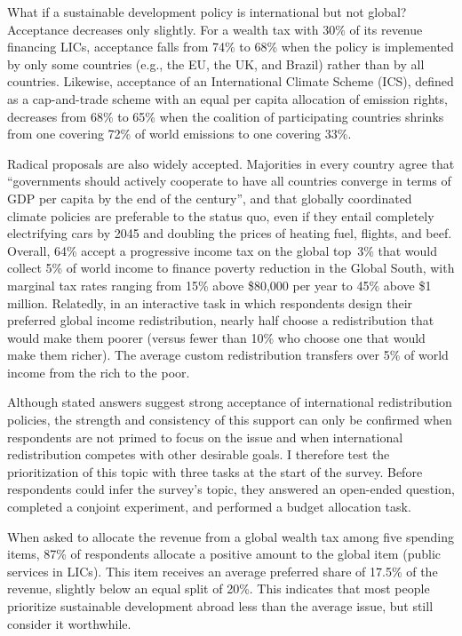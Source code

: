 \documentclass[12pt,english]{article}
\begin{document}
What if a sustainable development policy is international but not global? Acceptance decreases only slightly. For a wealth tax with 30\% of its revenue financing LICs, acceptance falls from 74\% to 68\% when the policy is implemented by only some countries (e.g., the EU, the UK, and Brazil) rather than by all countries. Likewise, acceptance of an International Climate Scheme (ICS), defined as a cap-and-trade scheme with an equal per capita allocation of emission rights, decreases from 68\% to 65\% when the coalition of participating countries shrinks from one covering 72\% of world emissions to one covering 33\%.

Radical proposals are also widely accepted. Majorities in every country agree that ``governments should actively cooperate to have all countries converge in terms of GDP per capita by the end of the century'', and that globally coordinated climate policies are preferable to the status quo, even if they entail completely electrifying cars by 2045 and doubling the prices of heating fuel, flights, and beef. Overall, 64\% accept a progressive income tax on the global top~3\% that would collect 5\% of world income to finance poverty reduction in the Global South, with marginal tax rates ranging from 15\% above \$80,000 per year to 45\% above \$1 million. Relatedly, in an interactive task in which respondents design their preferred global income redistribution, nearly half choose a redistribution that would make them poorer (versus fewer than 10\% who choose one that would make them richer). The average custom redistribution transfers over 5\% of world income from the rich to the poor. 

Although stated answers suggest strong acceptance of international redistribution policies, the strength and consistency of this support can only be confirmed when respondents are not primed to focus on the issue and when international redistribution competes with other desirable goals. I therefore test the prioritization of this topic with three tasks at the start of the survey. 
Before respondents could infer the survey's topic, they answered an open-ended question, completed a conjoint experiment, and performed a budget allocation task. 

When asked to allocate the revenue from a %
global wealth tax among five spending items, 87\% of respondents allocate a positive amount to the global item (public services in LICs). This item receives an average preferred share of 17.5\% of the revenue, slightly below an equal split of 20\%. %
This indicates that most people prioritize sustainable development abroad less than the average issue, but still consider it worthwhile. %
\end{document}
